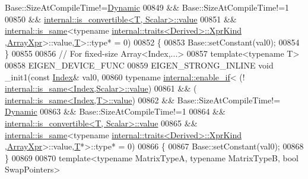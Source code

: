 \begin{DoxyCode}
      Base::SizeAtCompileTime!=\hyperlink{namespace_eigen_ad81fa7195215a0ce30017dfac309f0b2}{Dynamic}
00849                                                                   && Base::SizeAtCompileTime!=1
00850                                                                   && 
      \hyperlink{struct_eigen_1_1internal_1_1is__convertible}{internal::is\_convertible<T, Scalar>::value}
00851                                                                   && 
      \hyperlink{struct_eigen_1_1internal_1_1is__same}{internal::is\_same}<\textcolor{keyword}{typename} \hyperlink{struct_eigen_1_1internal_1_1traits}{internal::traits<Derived>::XprKind}
      ,\hyperlink{struct_eigen_1_1_array_xpr}{ArrayXpr}>::value,\hyperlink{group___sparse_core___module}{T}>::type* = 0)
00852     \{
00853       Base::setConstant(val0);
00854     \}
00855     
00856     \textcolor{comment}{// For fixed-size Array<Index,...>}
00857     \textcolor{keyword}{template}<\textcolor{keyword}{typename} T>
00858     EIGEN\_DEVICE\_FUNC
00859     EIGEN\_STRONG\_INLINE \textcolor{keywordtype}{void} \_init1(\textcolor{keyword}{const} \hyperlink{namespace_eigen_a62e77e0933482dafde8fe197d9a2cfde}{Index}& val0,
00860                                     \textcolor{keyword}{typename} \hyperlink{struct_eigen_1_1internal_1_1enable__if}{internal::enable\_if}<    (!
      \hyperlink{struct_eigen_1_1internal_1_1is__same}{internal::is\_same<Index,Scalar>::value})
00861                                                                   && (
      \hyperlink{struct_eigen_1_1internal_1_1is__same}{internal::is\_same<Index,T>::value})
00862                                                                   && Base::SizeAtCompileTime!=
      \hyperlink{namespace_eigen_ad81fa7195215a0ce30017dfac309f0b2}{Dynamic}
00863                                                                   && Base::SizeAtCompileTime!=1
00864                                                                   && 
      \hyperlink{struct_eigen_1_1internal_1_1is__convertible}{internal::is\_convertible<T, Scalar>::value}
00865                                                                   && 
      \hyperlink{struct_eigen_1_1internal_1_1is__same}{internal::is\_same}<\textcolor{keyword}{typename} \hyperlink{struct_eigen_1_1internal_1_1traits}{internal::traits<Derived>::XprKind}
      ,\hyperlink{struct_eigen_1_1_array_xpr}{ArrayXpr}>::value,\hyperlink{group___sparse_core___module}{T}*>::type* = 0)
00866     \{
00867       Base::setConstant(val0);
00868     \}
00869     
00870     \textcolor{keyword}{template}<\textcolor{keyword}{typename} MatrixTypeA, \textcolor{keyword}{typename} MatrixTypeB, \textcolor{keywordtype}{bool} SwapPo\textcolor{keywordtype}{int}ers>

\end{DoxyCode}
